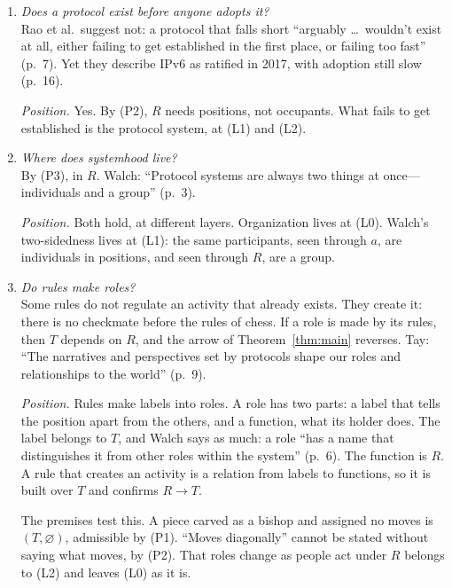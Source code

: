 \documentclass[10pt]{article}
\theoremstyle{definition}
\theoremstyle{remark}
\begin{document}
\begin{enumerate}[label=\textbf{Q\arabic*.}, leftmargin=2.2em, itemsep=0.75em, topsep=0.5em]
\item \emph{Does a protocol exist before anyone adopts it?}\\
Rao et al.\ suggest not: a protocol that falls short ``arguably \ldots\ wouldn't exist at all, either failing to get established in the first place, or failing too fast'' (p.~7). Yet they describe IPv6 as ratified in 2017, with adoption still slow (p.~16).

\textit{Position.} Yes. By (P2), $R$ needs positions, not occupants. What fails to get established is the protocol system, at (L1) and (L2).

\item \emph{Where does systemhood live?}\\
By (P3), in $R$. Walch: ``Protocol systems are always two things at once---individuals and a group'' (p.~3).

\textit{Position.} Both hold, at different layers. Organization lives at (L0). Walch's two-sidedness lives at (L1): the same participants, seen through $a$, are individuals in positions, and seen through $R$, are a group.

\item \emph{Do rules make roles?}\\
Some rules do not regulate an activity that already exists. They create it: there is no checkmate before the rules of chess. If a role is made by its rules, then $T$ depends on $R$, and the arrow of Theorem~\ref{thm:main} reverses. Tay: ``The narratives and perspectives set by protocols shape our roles and relationships to the world'' (p.~9).

\textit{Position.} Rules make labels into roles. A role has two parts: a label that tells the position apart from the others, and a function, what its holder does. The label belongs to $T$, and Walch says as much: a role ``has a name that distinguishes it from other roles within the system'' (p.~6). The function is $R$. A rule that creates an activity is a relation from labels to functions, so it is built over $T$ and confirms $R \to T$.

The premises test this. A piece carved as a bishop and assigned no moves is $(T, \varnothing)$, admissible by (P1). ``Moves diagonally'' cannot be stated without saying what moves, by (P2). That roles change as people act under $R$ belongs to (L2) and leaves (L0) as it is.
\end{enumerate}
\end{document}
